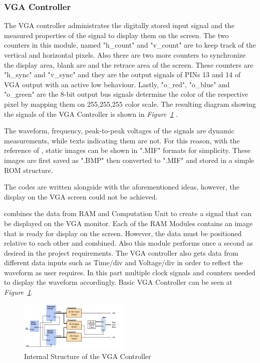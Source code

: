 \documentclass[paper]{IEEEtran}
\begin{document}
\subsubsection{VGA Controller} \- \indent

The VGA controller administrates the digitally stored input signal and the measured properties of the signal to display them on the screen. The two counters in this module, named "h\_count" and "v\_count" are to keep track of the vertical and horizontal pixels. Also there are two more counters to synchronize the display area, blank are and the retrace area of the screen. These counters are "h\_sync" and "v\_sync" and they are the output signals of PINs 13 and 14 of VGA output with an active low behaviour. Lastly, "o\_red", "o\_blue" and "o\_green" are the 8-bit output bus signals determine the color of the respective pixel by mapping them on 255,255,255 color scale. The resulting diagram showing the signals of the VGA Controller is shown in  \textit{Figure~\ref{fig:vgacontroller}} \cite{b4}.

The waveform, frequency, peak-to-peak voltages of the signals are dynamic measurements, while texts indicating them are not. For this reason, with the reference of \cite{b2}, static images can be shown in ".MIF" formats for simplicity. These images are first saved as ".BMP" then converted to ".MIF" and stored in a simple ROM structure.

The codes are written alongside with the aforementioned ideas, however, the display on the VGA screen could not be achieved. 

combines the data from RAM and Computation Unit to create a signal that can be displayed on the VGA monitor. Each of the RAM Modules contains an image that is ready for display on the screen. However, the data must be positioned relative to each other and combined. Also this module performs once a second as desired in the project requirements. The VGA controller also gets data from different data inputs such as Time/div and Voltage/div in order to reflect the waveform as user requires. In this part multiple clock signals and counters needed to display the waveform accordingly. Basic VGA Controller can be seen at \textit{Figure~\ref{fig:vgacontroller}}.

\begin{figure}[h!]
	\setlength{\unitlength}{\textwidth}
	\center 
	\includegraphics[width=0.47\textwidth]{vgacontroller}
	\caption{\label{fig:vgacontroller} Internal Structure of the VGA Controller}
\end{figure}
	
\end{document}
